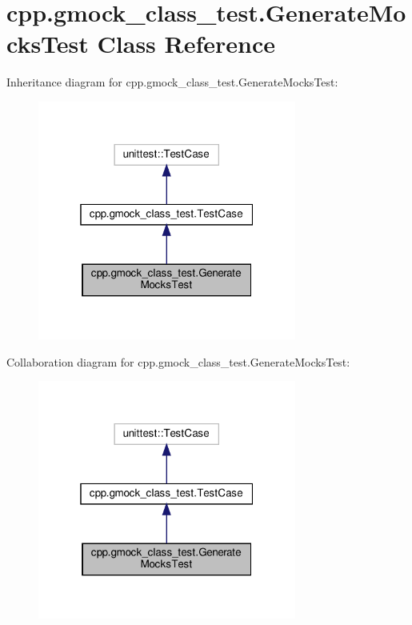 \hypertarget{classcpp_1_1gmock__class__test_1_1_generate_mocks_test}{}\section{cpp.\+gmock\+\_\+class\+\_\+test.\+Generate\+Mocks\+Test Class Reference}
\label{classcpp_1_1gmock__class__test_1_1_generate_mocks_test}


Inheritance diagram for cpp.\+gmock\+\_\+class\+\_\+test.\+Generate\+Mocks\+Test\+:
\nopagebreak
\begin{figure}[H]
\begin{center}
\leavevmode
\includegraphics[width=241pt]{classcpp_1_1gmock__class__test_1_1_generate_mocks_test__inherit__graph}
\end{center}
\end{figure}


Collaboration diagram for cpp.\+gmock\+\_\+class\+\_\+test.\+Generate\+Mocks\+Test\+:
\nopagebreak
\begin{figure}[H]
\begin{center}
\leavevmode
\includegraphics[width=241pt]{classcpp_1_1gmock__class__test_1_1_generate_mocks_test__coll__graph}
\end{center}
\end{figure}
